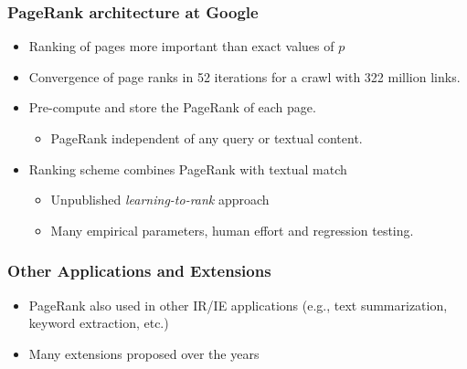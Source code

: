 \documentclass{beamer}
\begin{document}
\begin{frame}
  \frametitle{PageRank architecture at Google}
  \begin{itemize}
  \item Ranking of pages more important than exact values of $p$
  \item Convergence of page ranks in 52 iterations for a crawl with 322 million
    links.
  \item Pre-compute and store the PageRank of each page.
    \begin{itemize}
    \item PageRank independent of any query or textual content.
    \end{itemize}
  \item Ranking scheme combines PageRank with textual match
    \begin{itemize}
    \item Unpublished {\it learning-to-rank} approach
    \item Many empirical parameters, human effort and regression testing.
    \end{itemize}
  \end{itemize}
\end{frame}

\begin{frame} \frametitle{Other Applications and Extensions}
\begin{itemize}
\item PageRank also used in other IR/IE applications (e.g., text summarization, keyword extraction, etc.)
\item Many extensions proposed over the years
\end{itemize}
\end{frame}
\end{document}
